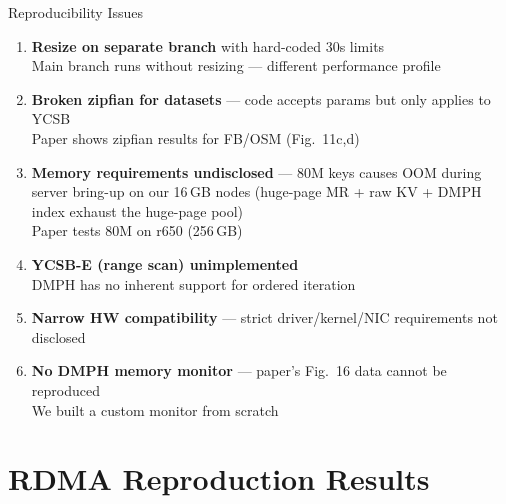 \documentclass[aspectratio=169]{beamer}
\begin{document}
\begin{frame}{Reproducibility Issues}
\begin{enumerate}
  \item \textbf{Resize on separate branch} with hard-coded 30s limits\\
        {\small Main branch runs without resizing --- different performance profile}
  \medskip
  \item \textbf{Broken zipfian for datasets} --- code accepts params but only applies to YCSB\\
        {\small Paper shows zipfian results for FB/OSM (Fig.~11c,d)}
  \medskip
  \item \textbf{Memory requirements undisclosed} --- 80M keys causes OOM during server bring-up on our 16\,GB nodes (huge-page MR + raw KV + DMPH index exhaust the huge-page pool)\\
        {\small Paper tests 80M on r650 (256\,GB)}
  \medskip
  \item \textbf{YCSB-E (range scan) unimplemented}\\
        {\small DMPH has no inherent support for ordered iteration}
  \medskip
  \item \textbf{Narrow HW compatibility} --- strict driver/kernel/NIC requirements not disclosed
  \medskip
  \item \textbf{No DMPH memory monitor} --- paper's Fig.~16 data cannot be reproduced\\
        {\small We built a custom monitor from scratch}
\end{enumerate}
\end{frame}

\section{RDMA Reproduction Results}
\end{document}
